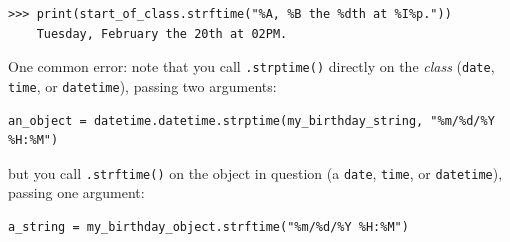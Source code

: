 \begin{Verbatim}[fontsize=\small,samepage=true,frame=single]
>>> print(start_of_class.strftime("%A, %B the %dth at %I%p."))
    Tuesday, February the 20th at 02PM.
\end{Verbatim}

One common error: note that you call \texttt{.strptime()} directly on the
\textit{class} (\texttt{date}, \texttt{time}, or \texttt{datetime}), passing
two arguments:

\begin{Verbatim}[fontsize=\small,samepage=true,frame=single]
an_object = datetime.datetime.strptime(my_birthday_string, "%m/%d/%Y %H:%M")
\end{Verbatim}

but you call \texttt{.strftime()} on the object in question
(a \texttt{date}, \texttt{time}, or \texttt{datetime}), passing
one argument:

\begin{Verbatim}[fontsize=\small,samepage=true,frame=single]
a_string = my_birthday_object.strftime("%m/%d/%Y %H:%M")
\end{Verbatim}



